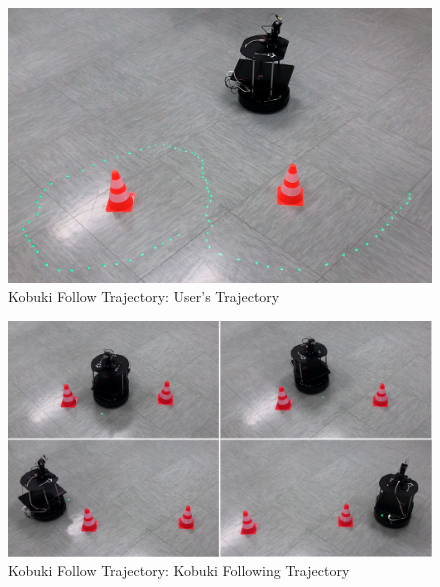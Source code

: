 \begin{figure}
	\centering
	\includegraphics[width=.7\textwidth]{img/kftTrajectory.png}%
	\caption{Kobuki Follow Trajectory: User's Trajectory}
	\label{fig:kftTrajectory}
\end{figure}
\begin{figure}
	\centering
	\includegraphics[width=\textwidth]{img/kftFollowing.png}%
	\caption{Kobuki Follow Trajectory: Kobuki Following Trajectory}
	\label{fig:kftFollowing}
\end{figure}
